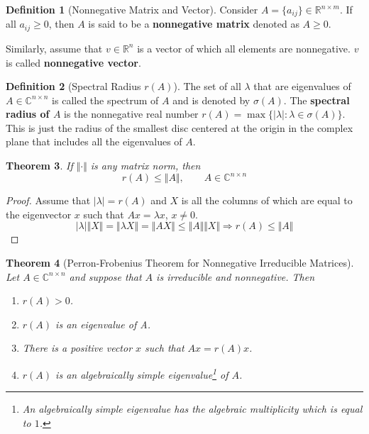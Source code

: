 \documentclass[11pt, a4paper, oneside, openany, reqno]{book}
\newtheorem{theorem}{Theorem}[chapter]
\theoremstyle{definition}
\newtheorem{definition}[theorem]{Definition}
\theoremstyle{remark}
\numberwithin{equation}{chapter} %
\newcommand{\R}{\ensuremath{{\mathbb R}}}
\newcommand{\C}{\ensuremath{{\mathbb C}}}
\begin{document}
\begin{definition}[Nonnegative Matrix and Vector]
	Consider $ A = \lbrace a_{ij} \rbrace \in \R^{n \times m} $.
	If all $ a_{ij} \geq 0 $, then $ A $ is said to be 
	a \textbf{nonnegative matrix} denoted as $ A \geq 0 $.
		
	Similarly, assume that $ v \in \R^{n} $ is a vector of which all elements are nonnegative. 
	$ v $ is called \textbf{nonnegative vector}.
\end{definition}

\begin{definition}[Spectral Radius $ r(A) $]
	The set of all $ \lambda $ that are eigenvalues of $ A \in \C^{n \times n} $ is
	called the spectrum of $ A $ and is denoted by $ \sigma(A) $. The \textbf{spectral radius of $ A $}
	is the nonnegative real number 
	$ r(A) = \max \lbrace \vert \lambda \vert : \lambda \in \sigma(A) \rbrace $.
	This is just the radius of the smallest disc centered at the origin in the complex plane
	that includes all the eigenvalues of $ A $.
\end{definition}

\begin{theorem}\label{spectralineq}
	If $ \Vert \cdot \Vert $ is any matrix norm, then
	\begin{equation}
		r(A) \leq \Vert A \Vert, \qquad A \in \C^{n \times n} 	
	\end{equation}
\end{theorem}
\begin{proof}%
	Assume that $ \vert \lambda \vert= r(A) $ and $ X $ is all the columns of which are
	equal to the eigenvector $ x $ such that $ Ax=\lambda x$, $ x \neq 0 $.	
	\[ \vert \lambda \vert \Vert X \Vert =  \Vert \lambda X \Vert  
		= \Vert AX \Vert \leq \Vert A \Vert	\Vert X \Vert 
		\Rightarrow r(A) \leq \Vert A \Vert \]	
\end{proof}

\begin{theorem}[Perron-Frobenius Theorem for Nonnegative Irreducible Matrices]\label{perron}
	Let $ A \in \C^{n \times n} $ and suppose that $ A $ is irreducible and nonnegative. Then
	\begin{enumerate}
		\item $ r(A) > 0 $.
		\item $ r(A) $ is an eigenvalue of A.
		\item There is a positive vector $ x $ such that $ Ax = r(A)x $.
		\item $ r(A) $ is an algebraically simple eigenvalue\footnote
		{An algebraically simple eigenvalue has the algebraic multiplicity which is equal to $ 1 $.}
		 of $ A $.
	\end{enumerate}
\end{theorem}
\end{document}
